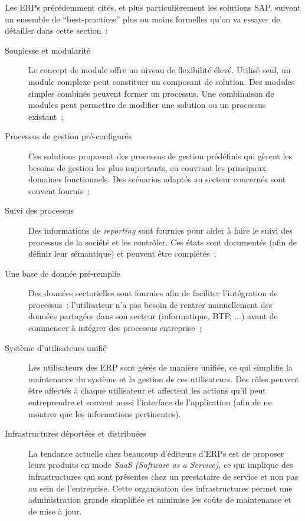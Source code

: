         Les ERPs précédemment cités, et plus particulièrement les solutions SAP, suivent un ensemble de ``best-practices'' plus ou moins formelles qu'on va essayer de détailler dans cette section~:

        \begin{description}

            \item[Souplesse et modularité] Le concept de module offre un niveau de flexibilité élevé. Utilisé seul, un module complexe peut constituer un composant de solution. Des modules simples combinés peuvent former un processus. Une combinaison de modules peut permettre de modifier une solution ou un processus existant~;

            \item[Processus de gestion pré-configurés] Ces solutions proposent des processus de gestion prédéfinis qui gèrent les besoins de gestion les plus importants, en couvrant les principaux domaines fonctionnels. Des scénarios adaptés au secteur concernés sont souvent fournis~;

            \item[Suivi des processus] Des informations de \textit{reporting} sont fournies pour aider à faire le suivi des processus de la société et les contrôler. Ces états sont documentés (afin de définir leur sémantique) et peuvent être complétés~;

            \item[Une base de donnée pré-remplie] Des données sectorielles sont fournies afin de faciliter l'intégration de processus~: l'utilisateur n'a pas besoin de rentrer manuellement des données partagées dans son secteur (informatique, BTP, ...) avant de commencer à intégrer des processus entreprise~;

            \item[Système d'utilisateurs unifié] Les utilisateurs des ERP sont gérés de manière unifiée, ce qui simplifie la maintenance du système et la gestion de ces utilisateurs. Des rôles peuvent être affectés à chaque utilisateur et affectent les actions qu'il peut entreprendre et souvent aussi l'interface de l'application (afin de ne montrer que les informations pertinentes).

            \item[Infrastructures déportées et distribuées] La tendance actuelle chez beaucoup d'éditeurs d'ERPs est de proposer leurs produits en mode \textit{SaaS (Software as a Service)}, ce qui implique des infrastructures qui sont présentes chez un prestataire de service et non pas au sein de l'entreprise. Cette organisation des infrastructures permet une administration grande simplifiée et minimise les coûts de maintenance et de mise à jour.

        \end{description}
